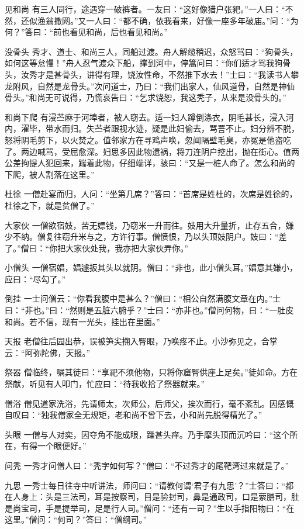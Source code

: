 \documentclass[12pt,UTF8]{ctexbook}
\begin{document}
见和尚
有三人同行，途遇穿一破裤者。一友曰：“这好像猎户张豝。”一人曰：“不然，还似渔翁撒网。”又一人曰：“都不确，依我看来，好像一座多年破庙。”问：“为何？”答曰：“前也看见和尚，后也看见和尚。”

没骨头
秀才、道士、和尚三人，同船过渡。舟人解缆稍迟，众怒骂曰：“狗骨头，如何这等怠慢！”舟人忍气渡众下船，撑到河中，停篙问曰：“你们适才骂我狗骨头，汝秀才是甚骨头，讲得有理，饶汝性命，不然推下水去！”士曰：“我读书人攀龙附风，自然是龙骨头。”次问道士，乃曰：“我们出家人，仙风道骨，自然是神仙骨头。”和尚无可说得，乃慌哀告曰：“乞求饶恕，我这秃子，从来是没骨头的。”

和尚下爬
有浸苎麻于河埠者，被人窃去。适一妇人蹲倒涤衣，阴毛甚长，浸入河内，濯毕，带水而归。失苎者跟视水迹，疑是此妇偷去，骂詈不止。妇分辨不脱，怒将阴毛剪下，以火焚之。值邻家方在寻鸡声唤，忽闻隔壁毛臭，亦冤是他盗吃了。两边喊骂，受屈愈深。妇思多因此物遗祸，将刀连阴户挖出，抛在街心。值两公差拘提人犯回来，踹着此物，仔细端详，骇曰：“又是一桩人命了。怎么和尚的下爬，被人割落在这里。”

杜徐
一僧赴宴而归，人问：“坐第几席？”答曰：“首席是姓杜的，次席是姓徐的，杜徐之下，就是贫僧了。”

大家伙
一僧欲宿妓，苦无嫖钱，乃窃米一升而往。妓用大升量折，止存五合，嫌少不纳。僧复往窃升米与之，方许行事。僧愤恨，乃以头顶妓阴户。妓曰：“差了。”僧曰：“你把大家伙处我，我亦把大家伙弄你。”

小僧头
一僧宿娼，娼遽扳其头以就阴。僧曰：“非也，此小僧头耳。”娼意其嫌小，应曰：“尽勾了。”

倒挂
一士问僧云：“你看我腹中是甚么？”僧曰：“相公自然满腹文章在内。”士曰：“非也。”曰：“然则是五脏六腑乎？”士曰：“亦非也。”僧问何物，曰：“一肚皮和尚。若不信，现有一光头，挂出在里面。”

天报
老僧往后园出恭，误被笋尖搠入臀眼，乃唤疼不止。小沙弥见之，合掌云：“阿弥陀佛，天报。”

祭器
僧临终，嘱其徒曰：“享祀不须他物，只将你窟臀供座上足矣。”徒如命。方在祭献，听见有人叩门，忙应曰：“待我收拾了祭器就来。”

僧浴
僧见道家洗浴，先请师太，次师公，后师父，挨次而行，毫不紊乱。因感慨自叹曰：“独我僧家全无规矩，老和尚不曾下去，小和尚先脱得精光了。”

头眼
一僧与人对奕，因夺角不能成眼，躁甚头痒。乃手摩头顶而沉吟曰：“这个所在，有得一个眼便好。”

问秃
一秀才问僧人曰：“秃字如何写？”僧曰：“不过秀才的尾靶湾过来就是了。”

九思
一秀士每日往寺中听讲法，师问曰：“请教何谓‘君子有九思’？”士答曰：“都在人身上：头是三法司，耳是按察司，目是验封司，鼻是通政司，口是萦膳司，肚是尚宝司，手是提举司，足是行人司。”僧问：“还有一司？”生以手指阳物曰：“在这里。”僧问：“何司？”答曰：“僧纲司。”
\end{document}
